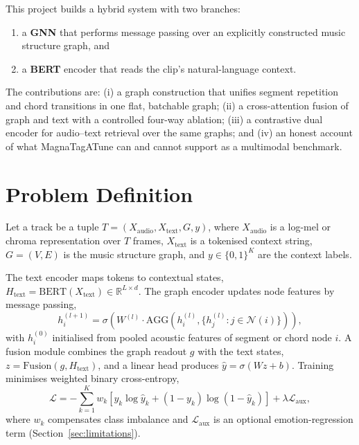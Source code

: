 \documentclass{article}
\begin{document}
This project builds a hybrid system with two branches:

\begin{enumerate}
  \item a \textbf{GNN} that performs message passing over an explicitly
        constructed music structure graph, and
  \item a \textbf{BERT} encoder that reads the clip's natural-language context.
\end{enumerate}

The contributions are: (i) a graph construction that unifies segment repetition
and chord transitions in one flat, batchable graph; (ii) a cross-attention fusion
of graph and text with a controlled four-way ablation; (iii) a contrastive dual
encoder for audio--text retrieval over the same graphs; and (iv) an honest
account of what MagnaTagATune can and cannot support as a multimodal benchmark.

\section{Problem Definition}
\label{sec:problem}

Let a track be a tuple $T = (X_{\text{audio}}, X_{\text{text}}, G, y)$, where
$X_{\text{audio}}$ is a log-mel or chroma representation over $T$ frames,
$X_{\text{text}}$ is a tokenised context string, $G = (V, E)$ is the music
structure graph, and $y \in \{0,1\}^{K}$ are the context labels.

The text encoder maps tokens to contextual states,
$H_{\text{text}} = \mathrm{BERT}(X_{\text{text}}) \in \mathbb{R}^{L \times d}$.
The graph encoder updates node features by message passing,
\begin{equation}
h_i^{(l+1)} = \sigma\!\left( W^{(l)} \cdot \mathrm{AGG}\!\left( h_i^{(l)}, \{ h_j^{(l)} : j \in \mathcal{N}(i) \} \right) \right),
\end{equation}
with $h_i^{(0)}$ initialised from pooled acoustic features of segment or chord
node $i$. A fusion module combines the graph readout $g$ with the text states,
$z = \mathrm{Fusion}(g, H_{\text{text}})$, and a linear head produces
$\hat{y} = \sigma(Wz + b)$. Training minimises weighted binary cross-entropy,
\begin{equation}
\mathcal{L} = -\sum_{k=1}^{K} w_k \left[ y_k \log \hat{y}_k + (1-y_k)\log(1-\hat{y}_k) \right] + \lambda \mathcal{L}_{\text{aux}},
\label{eq:loss}
\end{equation}
where $w_k$ compensates class imbalance and $\mathcal{L}_{\text{aux}}$ is an
optional emotion-regression term (Section~\ref{sec:limitations}).
\end{document}
